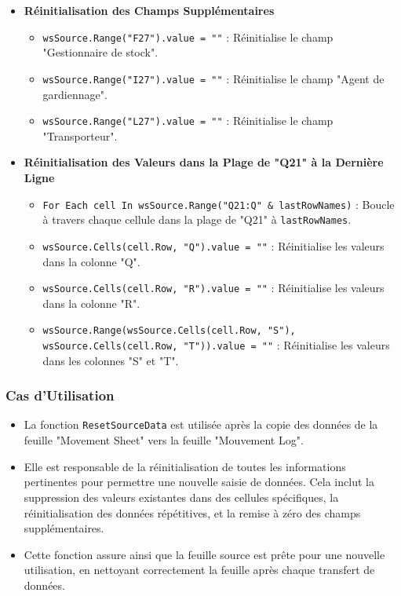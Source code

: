 \documentclass[a4paper, oneside, 12pt, final]{extreport}
\begin{document}
\begin{itemize}
    \item \textbf{Réinitialisation des Champs Supplémentaires}
    \begin{itemize}
        \item \texttt{wsSource.Range("F27").value = ""} : Réinitialise le champ "Gestionnaire de stock".
        \item \texttt{wsSource.Range("I27").value = ""} : Réinitialise le champ "Agent de gardiennage".
        \item \texttt{wsSource.Range("L27").value = ""} : Réinitialise le champ "Transporteur".
    \end{itemize}

    \item \textbf{Réinitialisation des Valeurs dans la Plage de "Q21" à la Dernière Ligne}
    \begin{itemize}
        \item \texttt{For Each cell In wsSource.Range("Q21:Q" \& lastRowNames)} : Boucle à travers chaque cellule dans la plage de "Q21" à \texttt{lastRowNames}.
        \item \texttt{wsSource.Cells(cell.Row, "Q").value = ""} : Réinitialise les valeurs dans la colonne "Q".
        \item \texttt{wsSource.Cells(cell.Row, "R").value = ""} : Réinitialise les valeurs dans la colonne "R".
        \item \texttt{wsSource.Range(wsSource.Cells(cell.Row, "S"), wsSource.Cells(cell.Row, "T")).value = ""} : Réinitialise les valeurs dans les colonnes "S" et "T".
    \end{itemize}
\end{itemize}

\subsubsection{Cas d'Utilisation}

\begin{itemize}
    \item La fonction \texttt{ResetSourceData} est utilisée après la copie des données de la feuille "Movement Sheet" vers la feuille "Mouvement Log".
    \item Elle est responsable de la réinitialisation de toutes les informations pertinentes pour permettre une nouvelle saisie de données. Cela inclut la suppression des valeurs existantes dans des cellules spécifiques, la réinitialisation des données répétitives, et la remise à zéro des champs supplémentaires.
    \item Cette fonction assure ainsi que la feuille source est prête pour une nouvelle utilisation, en nettoyant correctement la feuille après chaque transfert de données.
\end{itemize}
\end{document}
